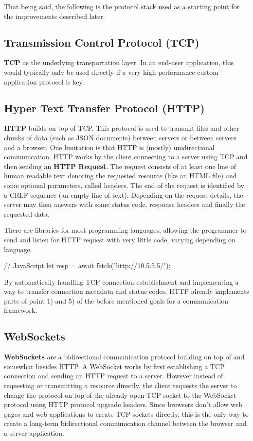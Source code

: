 \documentclass[conference]{IEEEtran}
\begin{document}
That being said, the following is the protocol stack used as a starting point for the improvements described later.

\subsection{Transmission Control Protocol (TCP)}

\textbf{TCP} as the underlying transportation layer. In an end-user application, this would typically only be used directly if a very high performance custom application protocol is key.


\subsection{Hyper Text Transfer Protocol (HTTP)}

\textbf{HTTP} builds on top of TCP. This protocol is used to transmit files and other chunks of data (such as JSON documents) between servers or between servers and a browser. One limitation is that HTTP is (mostly) unidirectional communication. HTTP works by the client connecting to a server using TCP and then sending an \textbf{HTTP Request}. The request consists of at least one line of human readable text denoting the requested resource (like an HTML file) and some optional parameters, called headers. The end of the request is identified by a CRLF sequence (an empty line of text). Depending on the request details, the server may then answers with some status code, response headers and finally the requested data.

There are libraries for most programming languages, allowing the programmer to send and listen for HTTP request with very little code, varying depending on language.

\begin{code-js}
// JavaScript
let resp = await fetch("http://10.5.5.5/");
\end{code-js}

By automatically handling TCP connection establishment and implementing a way to transfer connection metadata and status codes, HTTP already implements parts of point 1) and 5) of the before mentioned goals for a communication framework.


\subsection{WebSockets}

\textbf{WebSockets} are a bidirectional communication protocol building on top of and somewhat besides HTTP. A WebSocket works by first establishing a TCP connection and sending an HTTP request to a server. However instead of requesting or transmitting a resource directly, the client requests the server to change the protocol on top of the already open TCP socket to the WebSocket protocol using HTTP protocol upgrade headers. Since browsers don't allow web pages and web applications to create TCP sockets directly, this is the only way to create a long-term bidirectional communication channel between the browser and a server application. 
\end{document}
